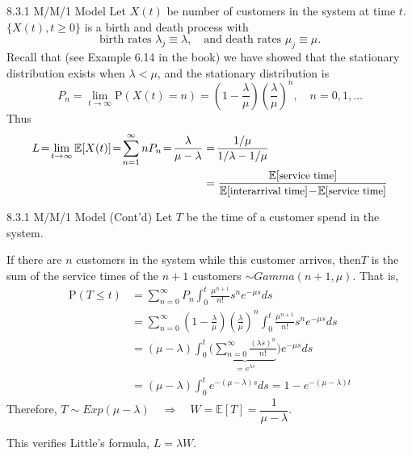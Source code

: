 \documentclass[letterpaper,handout]{beamer}
\def\Sum{\sum\nolimits}
\def\p{\mathrm P}
\def\E{\mathbb E}
\begin{document}
\begin{frame}{8.3.1 M/M/1 Model}
Let $X(t)$ be number of customers in the system at time $t$.
$\{X(t), t \ge 0\}$ is a birth and death process with
$$\text{birth rates }\lambda_j\equiv \lambda,\quad\text{and death rates }\mu_j\equiv \mu.$$
Recall that (see Example 6.14 in the book) we have showed that the stationary distribution exists when $\lambda<\mu$, and the stationary distribution is
$$
P_n=\lim_{t\to\infty}\p(X(t)=n)=\left(1-\frac{\lambda}{\mu}\right)\left(\frac{\lambda}{\mu}\right)^n,\quad n=0,1,\ldots
$$
Thus
\begin{align*}
L\!=\!\lim_{t\to\infty}\E[X(t)]\!=\!\sum_{n=1}^{\infty}nP_n\!=\!\frac{\lambda}{\mu-\lambda}&=\!\frac{1/\mu}{1/\lambda-1/\mu}\\
&=\frac{\E[\text{\small service time}]}{\E[\text{\small interarrival time}]\!-\!\E[\text{\small service time}]}
\end{align*}

\end{frame}
\begin{frame}{8.3.1 M/M/1 Model (Cont'd)}
Let $T$ be the time of a customer spend in the system. \par
If there are $n$ customers in the system while this customer arrives,
then$T$ is the sum of the service times of the $n+1$ customers $\sim Gamma(n+1,\mu).$
That is,
\begin{align*}
\p(T\le t)&=\Sum_{n=0}^{\infty}P_n\int_0^t\frac{\mu^{n+1}}{n!}s^ne^{-\mu s}ds\\
&=\Sum_{n=0}^{\infty}\left(1-\frac{\lambda}{\mu}\right)\left(\frac{\lambda}{\mu}\right)^n\int_0^t\frac{\mu^{n+1}}{n!}s^ne^{-\mu s}ds\\
&=(\mu-\lambda)\int_0^t\bigg(\underbrace{\Sum_{n=0}^{\infty}\frac{(\lambda s)^{n}}{n!}}_{=e^{\lambda s}}\bigg)e^{-\mu s}ds\\[-3pt]
&=(\mu-\lambda)\int_0^t e^{-(\mu-\lambda)s}ds=1-e^{-(\mu-\lambda)t}
\end{align*}
Therefore,
$T\sim Exp(\mu-\lambda)\quad \Rightarrow\quad W=\E[T]=\dfrac{1}{\mu-\lambda}.$\par
This verifies Little's formula, $L=\lambda W.$
\end{frame}
\end{document}

